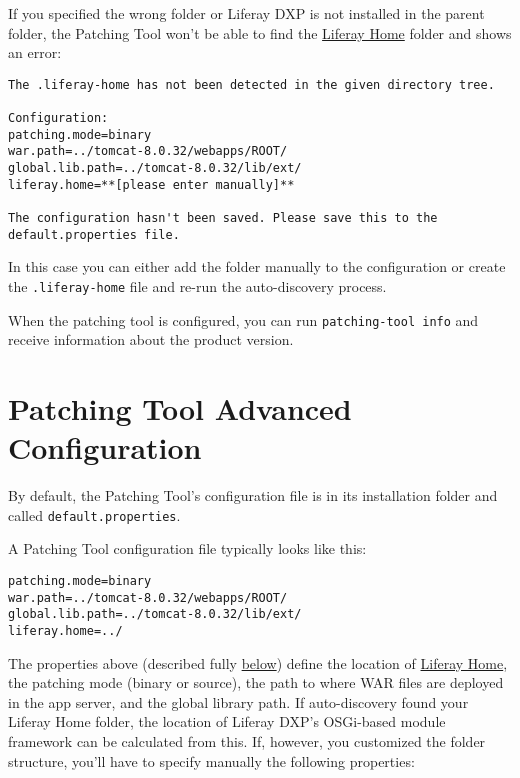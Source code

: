 If you specified the wrong folder or Liferay DXP is not installed in the
parent folder, the Patching Tool won't be able to find the
\href{/docs/7-0/deploy/-/knowledge_base/d/installing-product\#liferay-home}{Liferay
Home} folder and shows an error:

\begin{verbatim}
The .liferay-home has not been detected in the given directory tree.

Configuration:
patching.mode=binary
war.path=../tomcat-8.0.32/webapps/ROOT/
global.lib.path=../tomcat-8.0.32/lib/ext/
liferay.home=**[please enter manually]**

The configuration hasn't been saved. Please save this to the default.properties file.
\end{verbatim}

In this case you can either add the folder manually to the configuration
or create the \texttt{.liferay-home} file and re-run the auto-discovery
process.

When the patching tool is configured, you can run
\texttt{patching-tool\ info} and receive information about the product
version.

\section{Patching Tool Advanced
Configuration}\label{patching-tool-advanced-configuration}

By default, the Patching Tool's configuration file is in its
installation folder and called \texttt{default.properties}.

A Patching Tool configuration file typically looks like this:

\begin{verbatim}
patching.mode=binary
war.path=../tomcat-8.0.32/webapps/ROOT/
global.lib.path=../tomcat-8.0.32/lib/ext/
liferay.home=../
\end{verbatim}

The properties above (described fully
\hyperref[using-profiles-with-the-patching-tool]{below}) define the
location of
\href{/docs/7-0/deploy/-/knowledge_base/d/installing-product\#liferay-home}{Liferay
Home}, the patching mode (binary or source), the path to where WAR files
are deployed in the app server, and the global library path. If
auto-discovery found your Liferay Home folder, the location of Liferay
DXP's OSGi-based module framework can be calculated from this. If,
however, you customized the folder structure, you'll have to specify
manually the following properties:

